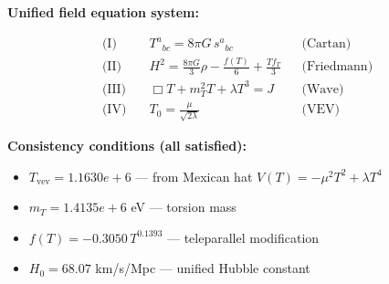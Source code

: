 
\textbf{Unified field equation system:}

\begin{align}
  \text{(I)} \quad & T^a{}_{bc} = 8\pi G \, s^a{}_{bc} && \text{(Cartan)} \\
  \text{(II)} \quad & H^2 = \frac{8\pi G}{3}\rho - \frac{f(T)}{6} + \frac{Tf_T}{3} && \text{(Friedmann)} \\
  \text{(III)} \quad & \Box T + m_T^2 T + \lambda T^3 = J && \text{(Wave)} \\
  \text{(IV)} \quad & T_0 = \frac{\mu}{\sqrt{2\lambda}} && \text{(VEV)}
\end{align}

\textbf{Consistency conditions (all satisfied):}
\begin{itemize}
  \item $T_{\text{vev}} = 1.1630e+6$ — from Mexican hat $V(T) = -\mu^2 T^2 + \lambda T^4$
  \item $m_T = 1.4135e+6$ eV — torsion mass
  \item $f(T) = -0.3050 \, T^{0.1393}$ — teleparallel modification
  \item $H_0 = 68.07$ km/s/Mpc — unified Hubble constant
\end{itemize}